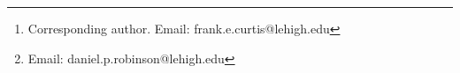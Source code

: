 \documentclass{imanum}
\begin{document}
\title{}
\shorttitle{}

\author{{\sc Frank E. Curtis\thanks{Corresponding author. Email: frank.e.curtis@lehigh.edu}}\\[2pt]
             Department of Industrial and Systems Engineering, Lehigh University\\[6pt]
        {\sc Daniel P.~Robinson\thanks{Email: daniel.p.robinson@lehigh.edu}}\\[2pt]
             Department of Industrial and Systems Engineering, Lehigh University}

\maketitle

\begin{abstract}
  {}
  {nonlinear optimization, nonsmooth optimization, variable-metric algorithms, quasi-Newton methods, self-correcting properties of BFGS updating}
\end{abstract}






\end{document}
